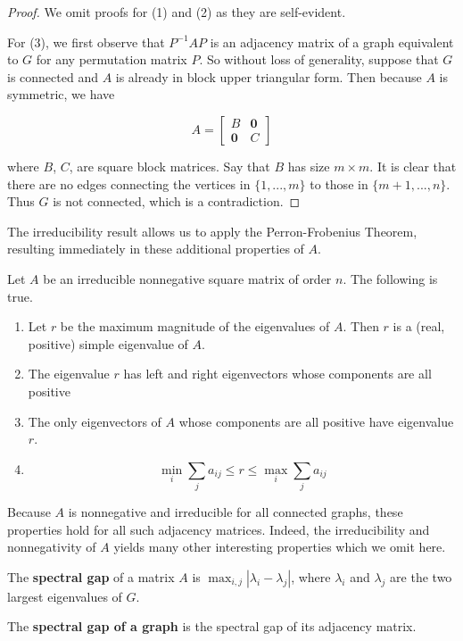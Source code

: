 \begin{proof}
  We omit proofs for (1) and (2) as they are self-evident.

  For (3), we first observe that $P^{-1}AP$ is an adjacency matrix of a graph
  equivalent to $G$ for any permutation matrix $P$. So without loss of generality, suppose that $G$ is
  connected and $A$ is already in block upper triangular form. Then because $A$
  is symmetric, we have

  \[
    A = \begin{bmatrix}
      B & \mathbf{0} \\
      \mathbf{0} & C
    \end{bmatrix}
  \]

  where $B$, $C$, are square block matrices. Say that $B$ has size $m \times m$. It is clear that
  there are no edges connecting the vertices in $\{1, ..., m\}$ to those in $\{m+1, ..., n\}$. Thus
  $G$ is not connected, which is a contradiction.
\end{proof}

The irreducibility result allows us to apply the Perron-Frobenius Theorem, resulting immediately in
these additional properties of $A$.

\begin{theorem}
  Let $A$ be an irreducible nonnegative square matrix of order $n$. The
  following is true.

  \begin{enumerate}
  \item Let $r$ be the maximum magnitude of the eigenvalues of $A$. Then $r$ is
    a (real, positive) simple eigenvalue of $A$.
  \item The eigenvalue $r$ has left and right eigenvectors whose components are
    all positive
  \item The only eigenvectors of $A$ whose components are all positive have
    eigenvalue $r$.
  \item
    \[ \min_i \sum_j a_{ij} \leq r \leq \max_i \sum_j a_{ij} \]
  \end{enumerate}
\end{theorem}

Because $A$ is nonnegative and irreducible for all connected graphs, these
properties hold for all such adjacency matrices. Indeed, the irreducibility and
nonnegativity of $A$ yields many other interesting properties which we omit
here.

\begin{definition}
  The \textbf{spectral gap} of a matrix $A$ is $\max_{i,j}|\lambda_i - \lambda_j|$, where
  $\lambda_i$ and $\lambda_j$ are the two largest eigenvalues of $G$.

  The \textbf{spectral gap of a graph} is the spectral gap of its adjacency matrix.
\end{definition}

